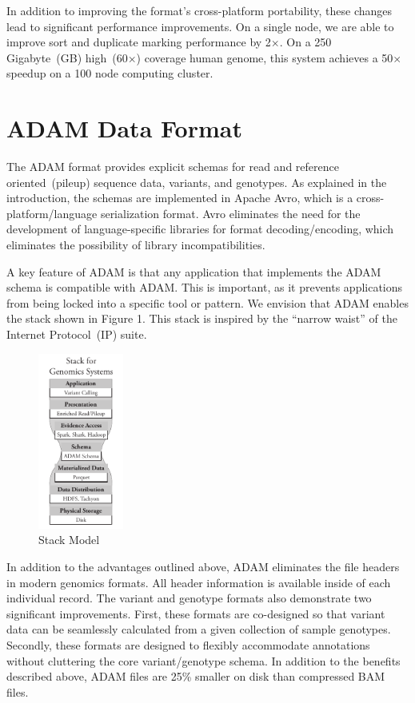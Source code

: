 \documentclass[10pt]{article}
\begin{document}
In addition to improving the format's cross-platform portability, these changes lead to significant performance improvements. On a single
node, we are able to improve sort and duplicate marking performance by 2$\times$. On a 250 Gigabyte~(GB) high~(60$\times$) coverage
human genome, this system achieves a 50$\times$ speedup on a 100 node computing cluster.

\section{ADAM Data Format}

The ADAM format provides explicit schemas for read and reference oriented~(pileup) sequence data, variants, and genotypes. As explained
in the introduction, the schemas are implemented in Apache Avro, which is a cross-platform/language serialization format. Avro eliminates
the need for the development of language-specific libraries for format decoding/encoding, which eliminates the possibility of library
incompatibilities.

A key feature of ADAM is that any application that implements the ADAM schema is compatible with ADAM. This is important, as it prevents
applications from being locked into a specific tool or pattern. We envision that ADAM enables the stack shown in Figure 1. This stack is
inspired by the ``narrow waist'' of the Internet Protocol~(IP) suite.

\begin{figure}
  \begin{center}
    \includegraphics[width=0.25\textwidth, trim=0 30 0 15]{stack-model.pdf}
  \end{center}
  \caption{Stack Model}
\end{figure}

In addition to the advantages outlined above, ADAM eliminates the file headers in modern genomics formats. All header information is available
inside of each individual record. The variant and genotype formats also demonstrate two significant improvements. First, these formats are
co-designed so that variant data can be seamlessly calculated from a given collection of sample genotypes. Secondly, these formats are designed
to flexibly accommodate annotations without cluttering the core variant/genotype schema. In addition to the benefits described above, ADAM
files are 25\% smaller on disk than compressed BAM files.
\end{document}
